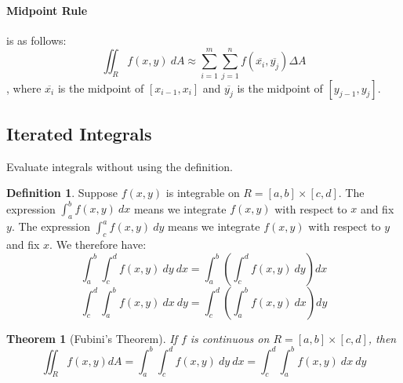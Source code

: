 \documentclass[12 pt]{article}
\newtheorem{thm}{Theorem}
\theoremstyle{definition}
\newtheorem{defn}{Definition}
\begin{document}
 \paragraph{Midpoint Rule} is as follows:
 $$ \iint_{R}f(x,y)\ dA \approx \sum_{i=1}^m \sum_{j=1}^n f(\overline{x_i},\overline{y_j}) \Delta A$$, where $\overline{x_i}$ is the midpoint of $[x_{i-1},x_i]$ and $\overline{y_j}$ is the midpoint of $[y_{j-1},y_j]$.
 \subsection{Iterated Integrals} Evaluate integrals without using the definition.
 \begin{defn}
   Suppose $f(x,y)$ is integrable on $R=[a,b]\times [c,d]$. The expression $\int_{a}^{b}f(x,y)\ dx$ means we integrate $f(x,y)$ with respect to $x$ and fix $y$. The expression $\int_{c}^{a}f(x,y)\ dy$ means we integrate $f(x,y)$ with respect to $y$ and fix $x$. We therefore have:
   $$ \int_{a}^{b}\int_{c}^d f(x,y) \ dy \ dx = \int_{a}^b \left(\int_{c}^d f(x,y)\ dy\right) dx $$
   $$ \int_{c}^{d}\int_{a}^b f(x,y) \ dx \ dy = \int_{c}^d \left(\int_{a}^b f(x,y)\ dx\right) dy $$
 \end{defn}
 \begin{thm}[Fubini's Theorem]
   If $f$ is continuous on $R=[a,b]\times [c,d]$, then
   $$ \iint_{R}f(x,y)dA =\int_{a}^{b}\int_{c}^{d}f(x,y)\ dy \ dx = \int_{c}^d \int_{a}^{b}f(x,y) \ dx \ dy $$
 \end{thm}
\end{document}
